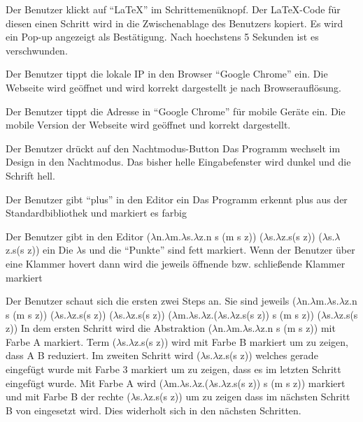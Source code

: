 \documentclass[parskip=full,11pt,twoside]{scrartcl}
\begin{document}
{Der Benutzer klickt auf \enquote{LaTeX} im Schrittemenüknopf.}
{Der LaTeX-Code für diesen einen Schritt wird in die Zwischenablage des Benutzers kopiert.
Es wird ein Pop-up angezeigt als Bestätigung. Nach hoechstens 5 Sekunden ist es verschwunden.}

{Der Benutzer tippt die lokale IP in den Browser \enquote {Google Chrome} ein.}
{Die Webseite wird geöffnet und wird korrekt dargestellt je nach Browserauflösung.}

{Der Benutzer tippt die Adresse in \enquote{Google Chrome} für mobile Geräte ein.}
{Die mobile Version der Webseite wird geöffnet und korrekt dargestellt.}

{Der Benutzer drückt auf den Nachtmodus-Button}
{Das Programm wechselt im Design in den Nachtmodus. Das bisher helle Eingabefenster wird dunkel und die Schrift hell.}





{Der Benutzer gibt \enquote{plus} in den Editor ein}
{Das Programm erkennt plus aus der Standardbibliothek und markiert es farbig}

{Der Benutzer gibt in den Editor \newline ($\lambda$n.$\lambda$m.$\lambda$s.$\lambda$z.n s (m s z)) ($\lambda$s.$\lambda$z.s(s z)) ($\lambda$s.$\lambda$z.s(s z)) ein }
{Die $\lambda$s und die \enquote{Punkte} sind fett markiert. Wenn der Benutzer über eine Klammer hovert dann wird die jeweils öffnende bzw. schließende Klammer markiert  }

{Der Benutzer schaut sich die ersten zwei Steps an. Sie sind jeweils
 \newline ($\lambda$n.$\lambda$m.$\lambda$s.$\lambda$z.n s (m s z)) ($\lambda$s.$\lambda$z.s(s z)) ($\lambda$s.$\lambda$z.s(s z))
 \newline ($\lambda$m.$\lambda$s.$\lambda$z.($\lambda$s.$\lambda$z.s(s z)) s (m s z)) ($\lambda$s.$\lambda$z.s(s z))
}
{In dem ersten Schritt wird die Abstraktion ($\lambda$n.$\lambda$m.$\lambda$s.$\lambda$z.n s (m s z)) mit Farbe A markiert. Term  ($\lambda$s.$\lambda$z.s(s z)) wird mit Farbe B markiert um zu zeigen, dass A B reduziert. Im zweiten Schritt wird  ($\lambda$s.$\lambda$z.s(s z)) welches gerade eingefügt wurde mit Farbe 3 markiert um zu zeigen, dass es im letzten Schritt eingefügt wurde. Mit Farbe A wird ($\lambda$m.$\lambda$s.$\lambda$z.($\lambda$s.$\lambda$z.s(s z)) s (m s z)) markiert und mit Farbe B der rechte ($\lambda$s.$\lambda$z.s(s z)) um zu zeigen dass im nächsten Schritt B von eingesetzt wird. Dies widerholt sich in den nächsten Schritten. }
\end{document}

